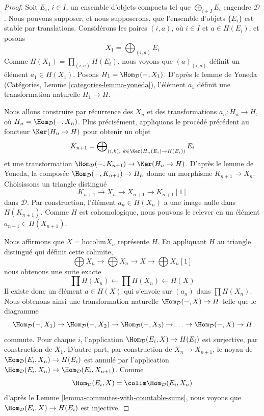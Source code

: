 \begin{proof}
Soit $E_i$, $i \in I$, un ensemble d'objets compacts tel que
$\bigoplus_{i \in I} E_i$ engendre $\mathcal{D}$. Nous pouvons supposer, et
nous supposerons, que l'ensemble d'objets $\{E_i\}$ est stable par
translations. Considérons les paires $(i, a)$, où $i \in I$ et
$a \in H(E_i)$, et posons
$$
X_1 = \bigoplus\nolimits_{(i, a)} E_i
$$
Comme $H(X_1) = \prod_{(i, a)} H(E_i)$, nous voyons que
$(a)_{(i, a)}$ définit un élément $a_1 \in H(X_1)$.
Posons $H_1 = \Hom_\mathcal{D}(- , X_1)$.
D'après le lemme de Yoneda
(Catégories, Lemme \ref{categories-lemma-yoneda}), l'élément $a_1$ définit une
transformation naturelle $H_1 \to H$.

\medskip\noindent
Nous allons construire par récurrence des $X_n$ et des transformations
$a_n : H_n \to H$, où $H_n = \Hom_\mathcal{D}(-, X_n)$.
Plus précisément, appliquons le procédé précédent au foncteur
$\Ker(H_n \to H)$ pour obtenir un objet
$$
K_{n + 1} = \bigoplus\nolimits_{(i, k),\ k \in \Ker(H_n(E_i) \to H(E_i))} E_i
$$
et une transformation
$\Hom_\mathcal{D}(-, K_{n + 1}) \to \Ker(H_n \to H)$.
D'après le lemme de Yoneda, la composée
$\Hom_\mathcal{D}(-, K_{n + 1}) \to H_n$ donne un morphisme
$K_{n + 1} \to X_n$. Choisissons un triangle distingué
$$
K_{n + 1} \to X_n \to X_{n + 1} \to K_{n + 1}[1]
$$
dans $\mathcal{D}$. Par construction, l'élément $a_n \in H(X_n)$ a une image
nulle dans $H(K_{n + 1})$. Comme $H$ est cohomologique, nous pouvons le relever
en un élément $a_{n + 1} \in H(X_{n + 1})$.

\medskip\noindent
Nous affirmons que $X = \text{hocolim} X_n$ représente $H$.
En appliquant $H$ au triangle distingué qui définit cette colimite,
$$
\bigoplus X_n \to
\bigoplus X_n \to X \to
\bigoplus X_n[1]
$$
nous obtenons une suite exacte
$$
\prod H(X_n) \leftarrow 
\prod H(X_n) \leftarrow 
H(X)
$$
Il existe donc un élément $a \in H(X)$ qui s'envoie sur $(a_n)$ dans
$\prod H(X_n)$. Nous obtenons ainsi une transformation naturelle
$\Hom_\mathcal{D}(- , X) \to H$ telle que le diagramme
$$
\Hom_\mathcal{D}(-, X_1) \to
\Hom_\mathcal{D}(-, X_2) \to
\Hom_\mathcal{D}(-, X_3) \to \ldots \to
\Hom_\mathcal{D}(-, X) \to H
$$
commute. Pour chaque $i$, l'application
$\Hom_\mathcal{D}(E_i, X) \to H(E_i)$ est surjective, par construction de
$X_1$. D'autre part, par construction de $X_n \to X_{n + 1}$, le noyau de
$\Hom_\mathcal{D}(E_i, X_n) \to H(E_i)$ est annulé par l'application
$\Hom_\mathcal{D}(E_i, X_n) \to \Hom_\mathcal{D}(E_i, X_{n + 1})$.
Comme
$$
\Hom_\mathcal{D}(E_i, X) = \colim \Hom_\mathcal{D}(E_i, X_n)
$$
d'après le Lemme \ref{lemma-commutes-with-countable-sums}, nous voyons que
$\Hom_\mathcal{D}(E_i, X) \to H(E_i)$ est injective.


\end{proof}
